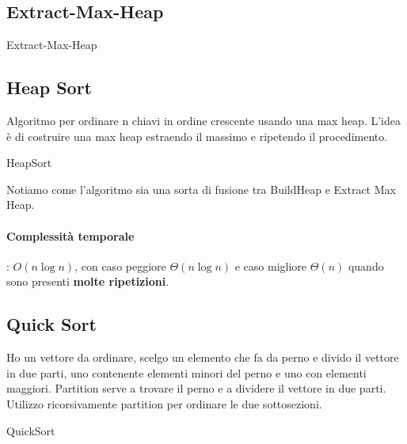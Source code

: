 \documentclass{article}
\begin{document}
\hypertarget{extractmaxheap}{}\subsection{Extract-Max-Heap} %

\begin{algorithm}[H]
\caption{Extract-Max-Heap}
\end{algorithm}


    
\hypertarget{heapsort}{}\subsection{Heap Sort} %
Algoritmo per ordinare n chiavi in ordine crescente usando una max heap. L'idea è di costruire una max heap estraendo il massimo e ripetendo il procedimento.
\begin{algorithm}[H]
\caption{HeapSort}
\end{algorithm}

Notiamo come l'algoritmo sia una sorta di fusione tra BuildHeap e Extract Max Heap.

\paragraph{Complessità temporale}: $O(n \log n)$, con caso peggiore $\Theta(n \log n)$ e caso migliore $\Theta(n)$ quando sono presenti \textbf{molte ripetizioni}. 

\hypertarget{quicksort}{}\subsection{Quick Sort} %
Ho un vettore da ordinare, scelgo un elemento che fa da perno e divido il vettore in due parti, uno contenente 
elementi minori del perno e uno con elementi maggiori. Partition serve a trovare il perno e a dividere il vettore in due parti.
Utilizzo ricorsivamente partition per ordinare le due sottosezioni.

\begin{algorithm}[H]
\caption{QuickSort}
\end{algorithm}
\end{document}
